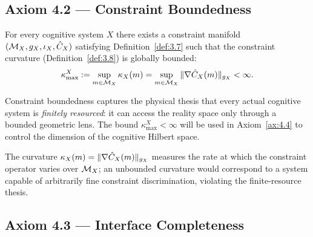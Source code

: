 \subsection{Axiom 4.2 — Constraint Boundedness}
\label{sec:ch4:ax2}

\begin{axiom}
\label{ax:4.2}
For every cognitive system $X$ there exists a constraint manifold
$(\mathcal{M}_X, g_X, \iota_X, \hat{C}_X)$ satisfying
Definition~\textup{\ref{def:3.7}} such that the constraint curvature
\textup{(}Definition~\textup{\ref{def:3.8})} is globally bounded:
\[
  \kappa_{\max}^X
  := \sup_{m \in \mathcal{M}_X} \kappa_X(m)
  = \sup_{m \in \mathcal{M}_X} \|\nabla \hat{C}_X(m)\|_{g_X}
  < \infty.
\]
\end{axiom}

\begin{remark}
\label{rem:4.2}
Constraint boundedness captures the physical thesis that every actual
cognitive system is \emph{finitely resourced}: it can access the
reality space only through a bounded geometric lens.  The bound
$\kappa_{\max}^X < \infty$ will be used in Axiom~\ref{ax:4.4} to
control the dimension of the cognitive Hilbert space.

The curvature $\kappa_X(m) = \|\nabla\hat{C}_X(m)\|_{g_X}$ measures
the rate at which the constraint operator varies over $\mathcal{M}_X$; an
unbounded curvature would correspond to a system capable of
arbitrarily fine constraint discrimination, violating the finite-resource
thesis.
\end{remark}

\subsection{Axiom 4.3 — Interface Completeness}
\label{sec:ch4:ax3}

